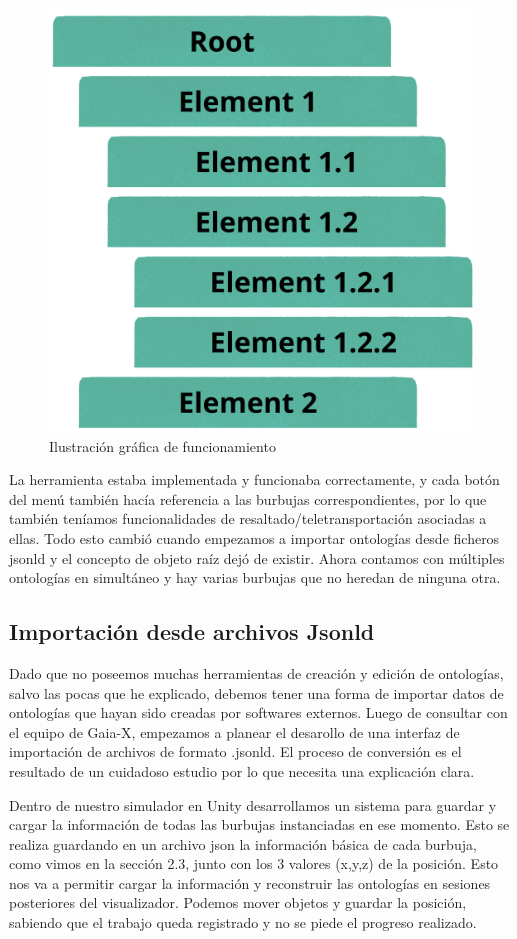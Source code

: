 \begin{figure}[ht]
   \begin{center}
      \includegraphics[width=0.6\linewidth]{chapter2/figures/hierarchy.png}
   \end{center}
   \caption[Ilustración gráfica de funcionamiento]
   {\footnotesize Ilustración gráfica de funcionamiento}
\end{figure}

La herramienta estaba implementada y funcionaba correctamente, y cada botón del menú también hacía referencia a las burbujas correspondientes, por lo que también teníamos funcionalidades de resaltado/teletransportación asociadas a ellas. Todo esto cambió cuando empezamos a importar ontologías desde ficheros jsonld y el concepto de objeto raíz dejó de existir. Ahora contamos con múltiples ontologías en simultáneo y hay varias burbujas que no heredan de ninguna otra.

\subsection{Importación desde archivos Jsonld}

Dado que no poseemos muchas herramientas de creación y edición de ontologías, salvo las pocas que he explicado, debemos tener una forma de importar datos de ontologías que hayan sido creadas por softwares externos. Luego de consultar con el equipo de Gaia-X, empezamos a planear el desarollo de una interfaz de importación de archivos de formato .jsonld.
El proceso de conversión es el resultado de un cuidadoso estudio por lo que necesita una explicación clara.

Dentro de nuestro simulador en Unity desarrollamos un sistema para guardar y cargar la información de todas las burbujas instanciadas en ese momento. Esto se realiza guardando en un archivo json la información básica de cada burbuja, como vimos en la sección 2.3, junto con los 3 valores (x,y,z) de la posición. Esto nos va a permitir cargar la información y reconstruir las ontologías en sesiones posteriores del visualizador. Podemos mover objetos y guardar la posición, sabiendo que el trabajo queda registrado y no se piede el progreso realizado.

